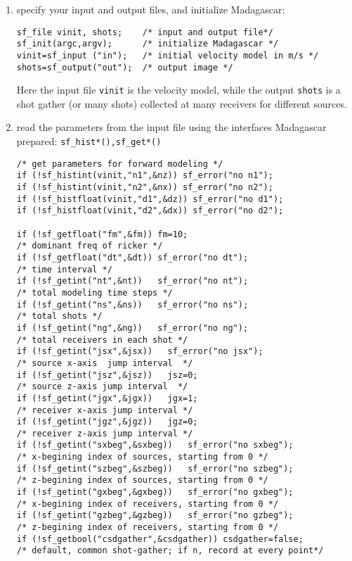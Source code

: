 \begin{enumerate}
 
 \item specify your input and output files, and initialize Madagascar: \\
\lstset{language=c,numbers=left,numberstyle=\tiny,showstringspaces=false,frame=single}
\begin{lstlisting}
sf_file vinit, shots;    /* input and output file*/    
sf_init(argc,argv);      /* initialize Madagascar */
vinit=sf_input ("in");   /* initial velocity model in m/s */
shots=sf_output("out");  /* output image */ 
 \end{lstlisting}
Here the input file \texttt{vinit} is the velocity model, while the output \texttt{shots} is a shot gather (or many shots) collected at many receivers for different sources.
 \item read the parameters from the input file  using the interfaces Madagascar prepared: \texttt{sf\_hist*(),sf\_get*()}
 \begin{lstlisting}
/* get parameters for forward modeling */
if (!sf_histint(vinit,"n1",&nz)) sf_error("no n1");
if (!sf_histint(vinit,"n2",&nx)) sf_error("no n2");
if (!sf_histfloat(vinit,"d1",&dz)) sf_error("no d1");
if (!sf_histfloat(vinit,"d2",&dx)) sf_error("no d2");

if (!sf_getfloat("fm",&fm)) fm=10;
/* dominant freq of ricker */
if (!sf_getfloat("dt",&dt)) sf_error("no dt");
/* time interval */
if (!sf_getint("nt",&nt))   sf_error("no nt");
/* total modeling time steps */
if (!sf_getint("ns",&ns))   sf_error("no ns");
/* total shots */
if (!sf_getint("ng",&ng))   sf_error("no ng");
/* total receivers in each shot */
if (!sf_getint("jsx",&jsx))   sf_error("no jsx");
/* source x-axis  jump interval  */
if (!sf_getint("jsz",&jsz))   jsz=0;
/* source z-axis jump interval  */
if (!sf_getint("jgx",&jgx))   jgx=1;
/* receiver x-axis jump interval */
if (!sf_getint("jgz",&jgz))   jgz=0;
/* receiver z-axis jump interval */
if (!sf_getint("sxbeg",&sxbeg))   sf_error("no sxbeg");
/* x-begining index of sources, starting from 0 */
if (!sf_getint("szbeg",&szbeg))   sf_error("no szbeg");
/* z-begining index of sources, starting from 0 */
if (!sf_getint("gxbeg",&gxbeg))   sf_error("no gxbeg");
/* x-begining index of receivers, starting from 0 */
if (!sf_getint("gzbeg",&gzbeg))   sf_error("no gzbeg");
/* z-begining index of receivers, starting from 0 */
if (!sf_getbool("csdgather",&csdgather)) csdgather=false;
/* default, common shot-gather; if n, record at every point*/
 \end{lstlisting}
 

\end{enumerate}
